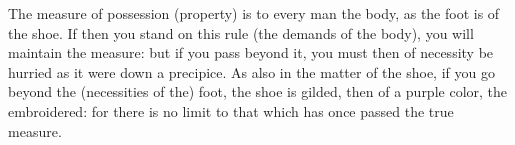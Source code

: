 The measure of possession  (property) is to every man the body,  as the foot is
of the shoe. If then you stand on this rule (the demands of the body), you will
maintain the measure: but if you pass  beyond it, you must then of necessity be
hurried as it were down a precipice. As  also in the matter of the shoe, if you
go beyond the (necessities  of the) foot, the shoe is gilded,  then of a purple
color, the embroidered: for there is no limit to that which has once passed the
true measure.
